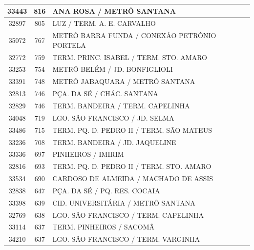 \documentclass[
	12pt,				%
	oneside,			%
	a4paper,			%
	english,			%
	brazil				%
	]{abntex2ppgsi}
\begin{document}
\begin{apendicesenv}
\begin{longtable}{c|c|p{7cm}}
    33443 & 816   & ANA ROSA / METRÔ SANTANA \\
\hline

    32897 & 805   & LUZ / TERM. A. E. CARVALHO \\
\hline

    35072 & 767   & METRÔ BARRA FUNDA / CONEXÃO PETRÔNIO PORTELA \\
\hline

    32772 & 759   & TERM. PRINC. ISABEL / TERM. STO. AMARO \\
\hline

    33253 & 754   & METRÔ BELÉM / JD. BONFIGLIOLI \\
\hline

    33391 & 748   & METRÔ JABAQUARA / METRÔ SANTANA \\
\hline

    32813 & 746   & PÇA. DA SÉ / CHÁC. SANTANA \\
\hline

    32829 & 746   & TERM. BANDEIRA / TERM. CAPELINHA \\
\hline

    34048 & 719   & LGO. SÃO FRANCISCO / JD. SELMA \\
\hline

    33486 & 715   & TERM. PQ. D. PEDRO II / TERM. SÃO MATEUS \\
\hline

    33236 & 708   & TERM. BANDEIRA / JD. JAQUELINE \\
\hline

    33336 & 697   & PINHEIROS / IMIRIM \\
\hline

    32816 & 693   & TERM. PQ. D. PEDRO II / TERM. STO. AMARO \\
\hline

    33534 & 690   & CARDOSO DE ALMEIDA / MACHADO DE ASSIS \\
\hline

    32838 & 647   & PÇA. DA SÉ / PQ. RES. COCAIA \\
\hline

    33398 & 639   & CID. UNIVERSITÁRIA / METRÔ SANTANA \\
\hline

    32769 & 638   & LGO. SÃO FRANCISCO / TERM. CAPELINHA \\
\hline

    33114 & 637   & TERM. PINHEIROS / SACOMÃ \\
\hline

    34210 & 637   & LGO. SÃO FRANCISCO / TERM. VARGINHA \\
\hline


\end{longtable}
\end{apendicesenv}
\end{document}
